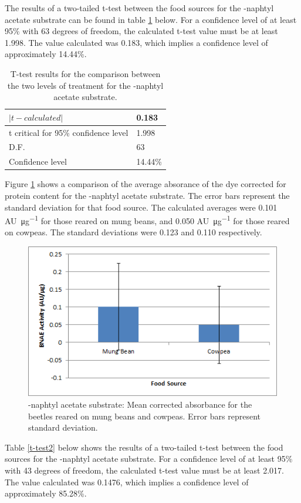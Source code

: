 \documentclass[12pt]{article}
\begin{document}
	The results of a two-tailed t-test between the food sources for the \textalpha-naphtyl acetate substrate can be found in table \ref{t-test1} below. For a confidence level of at least 95\% with 63 degrees of freedom, the calculated t-test value must be at least 1.998. The value calculated was 0.183, which implies a confidence level of approximately 14.44\%.\\
	
	\begin{table}[h]
		\centering
		\begin{tabular}{|l|l|} \hline
			$|t-calculated|$ & 0.183 \\ \hline
			t critical for 95\% confidence level & 1.998 \\ \hline
			D.F. & 63 \\ \hline
			Confidence level & 14.44\% \\ \hline
		\end{tabular}
		\caption{T-test results for the comparison between the two levels of treatment for the \textalpha-naphtyl acetate substrate.}
		\label{t-test1}
	\end{table}
	
	Figure \ref{bnae} shows a comparison of the average absorance of the dye corrected for protein content for the \textbeta-naphtyl acetate substrate. The error bars represent the standard deviation for that food source. The calculated averages were 0.101 \si{AU\per\micro\gram} for those reared on mung beans, and 0.050 \si{AU\per\micro\gram} for those reared on cowpeas. The standard deviations were 0.123 and	0.110 respectively. 	
	\begin{figure}[h!]
		\centering
		\includegraphics{BNAE.png}
		\caption{\textbeta-naphtyl acetate substrate: Mean corrected absorbance for the beetles reared on mung beans and cowpeas. Error bars represent standard deviation.}
		\label{bnae}
	\end{figure}
	\newpage
	Table \ref{t-test2} below shows the results of a two-tailed t-test between the food sources for the \textbeta-naphtyl acetate substrate. For a confidence level of at least 95\% with 43 degrees of freedom, the calculated t-test value must be at least 2.017. The value calculated was 0.1476, which implies a confidence level of approximately 85.28\%.\\
	
\end{document}
